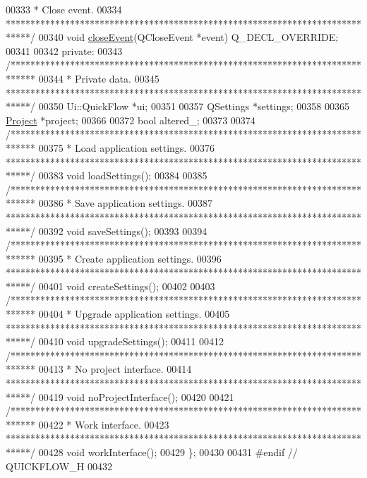 \begin{DoxyCode}
00333 \textcolor{comment}{  * Close event.}
00334 \textcolor{comment}{  *****************************************************************************/}
00340   \textcolor{keywordtype}{void} \hyperlink{group___window_gac8cc1bb329961a0781ffed7b6f2ab402}{closeEvent}(QCloseEvent *event) Q\_DECL\_OVERRIDE;
00341 
00342 \textcolor{keyword}{private}:
00343   \textcolor{comment}{/*****************************************************************************}
00344 \textcolor{comment}{  * Private data.}
00345 \textcolor{comment}{  *****************************************************************************/}
00350   Ui::QuickFlow *ui;
00351 
00357   QSettings *settings;
00358 
00365   \hyperlink{class_project}{Project} *project;
00366 
00372   \textcolor{keywordtype}{bool} altered\_;
00373 
00374   \textcolor{comment}{/*****************************************************************************}
00375 \textcolor{comment}{  * Load application settings.}
00376 \textcolor{comment}{  *****************************************************************************/}
00383   \textcolor{keywordtype}{void} loadSettings();
00384 
00385   \textcolor{comment}{/*****************************************************************************}
00386 \textcolor{comment}{  * Save application settings.}
00387 \textcolor{comment}{  *****************************************************************************/}
00392   \textcolor{keywordtype}{void} saveSettings();
00393 
00394   \textcolor{comment}{/*****************************************************************************}
00395 \textcolor{comment}{  * Create application settings.}
00396 \textcolor{comment}{  *****************************************************************************/}
00401   \textcolor{keywordtype}{void} createSettings();
00402 
00403   \textcolor{comment}{/*****************************************************************************}
00404 \textcolor{comment}{  * Upgrade application settings.}
00405 \textcolor{comment}{  *****************************************************************************/}
00410   \textcolor{keywordtype}{void} upgradeSettings();
00411 
00412   \textcolor{comment}{/*****************************************************************************}
00413 \textcolor{comment}{   * No project interface.}
00414 \textcolor{comment}{   *****************************************************************************/}
00419   \textcolor{keywordtype}{void} noProjectInterface();
00420 
00421   \textcolor{comment}{/*****************************************************************************}
00422 \textcolor{comment}{  * Work interface.}
00423 \textcolor{comment}{  *****************************************************************************/}
00428   \textcolor{keywordtype}{void} workInterface();
00429 \};
00430 
00431 \textcolor{preprocessor}{#endif  // QUICKFLOW\_H}
00432 
\end{DoxyCode}
